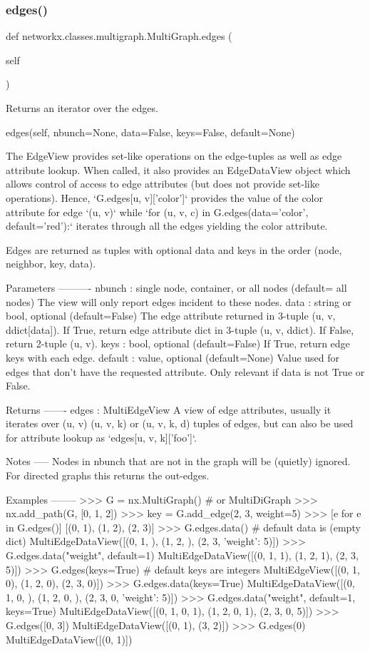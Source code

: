 \subsubsection{\texorpdfstring{edges()}{edges()}}
{\footnotesize\ttfamily def networkx.\+classes.\+multigraph.\+Multi\+Graph.\+edges (\begin{DoxyParamCaption}\item[{}]{self }\end{DoxyParamCaption})}

\begin{DoxyVerb}Returns an iterator over the edges.

edges(self, nbunch=None, data=False, keys=False, default=None)

The EdgeView provides set-like operations on the edge-tuples
as well as edge attribute lookup. When called, it also provides
an EdgeDataView object which allows control of access to edge
attributes (but does not provide set-like operations).
Hence, `G.edges[u, v]['color']` provides the value of the color
attribute for edge `(u, v)` while
`for (u, v, c) in G.edges(data='color', default='red'):`
iterates through all the edges yielding the color attribute.

Edges are returned as tuples with optional data and keys
in the order (node, neighbor, key, data).

Parameters
----------
nbunch : single node, container, or all nodes (default= all nodes)
    The view will only report edges incident to these nodes.
data : string or bool, optional (default=False)
    The edge attribute returned in 3-tuple (u, v, ddict[data]).
    If True, return edge attribute dict in 3-tuple (u, v, ddict).
    If False, return 2-tuple (u, v).
keys : bool, optional (default=False)
    If True, return edge keys with each edge.
default : value, optional (default=None)
    Value used for edges that don't have the requested attribute.
    Only relevant if data is not True or False.

Returns
-------
edges : MultiEdgeView
    A view of edge attributes, usually it iterates over (u, v)
    (u, v, k) or (u, v, k, d) tuples of edges, but can also be
    used for attribute lookup as `edges[u, v, k]['foo']`.

Notes
-----
Nodes in nbunch that are not in the graph will be (quietly) ignored.
For directed graphs this returns the out-edges.

Examples
--------
>>> G = nx.MultiGraph()  # or MultiDiGraph
>>> nx.add_path(G, [0, 1, 2])
>>> key = G.add_edge(2, 3, weight=5)
>>> [e for e in G.edges()]
[(0, 1), (1, 2), (2, 3)]
>>> G.edges.data()  # default data is {} (empty dict)
MultiEdgeDataView([(0, 1, {}), (1, 2, {}), (2, 3, {'weight': 5})])
>>> G.edges.data("weight", default=1)
MultiEdgeDataView([(0, 1, 1), (1, 2, 1), (2, 3, 5)])
>>> G.edges(keys=True)  # default keys are integers
MultiEdgeView([(0, 1, 0), (1, 2, 0), (2, 3, 0)])
>>> G.edges.data(keys=True)
MultiEdgeDataView([(0, 1, 0, {}), (1, 2, 0, {}), (2, 3, 0, {'weight': 5})])
>>> G.edges.data("weight", default=1, keys=True)
MultiEdgeDataView([(0, 1, 0, 1), (1, 2, 0, 1), (2, 3, 0, 5)])
>>> G.edges([0, 3])
MultiEdgeDataView([(0, 1), (3, 2)])
>>> G.edges(0)
MultiEdgeDataView([(0, 1)])
\end{DoxyVerb}
